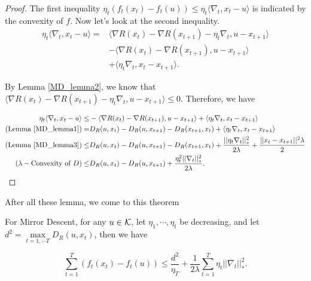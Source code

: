 \documentclass[../main.tex]{subfiles}
\begin{document}
\begin{proof}
	The first inequality $\eta_t (f_t(x_t) - f_t(u)) \leq \eta_t \langle \nabla_t, x_t -u \rangle $ is indicated by the convexity of $f$. Now let's look at the second inequality.
	\begin{equation*}
		\begin{aligned}
			\eta_t\langle \nabla_t, x_t -u \rangle =&  \langle \nabla R(x_t) - \nabla R(x_{t+1})-\eta_t \nabla_t , u -x_{t+1}\rangle  \\
													& -  \langle \nabla R(x_t) - \nabla R(x_{t+1})  , u -x_{t+1}\rangle  \\
													& +  \langle \eta_t \nabla_t  , x_t -x_{t+1}\rangle.
		\end{aligned}
	\end{equation*}


By Lemma \ref{MD_lemma2}, we know that $\langle \nabla R(x_t) - \nabla R(x_{t+1})-\eta_t \nabla_t , u -x_{t+1}\rangle \leq 0$. Therefore, we have

\begin{equation*}
	\begin{aligned}
	\eta_t\langle \nabla_t, x_t -u \rangle \leq  
	& -  \langle \nabla R(x_t) - \nabla R(x_{t+1})  , u -x_{t+1}\rangle  +  \langle \eta_t \nabla_t  , x_t -x_{t+1}\rangle \\
	\textmd{(Lemma \ref{MD_lemma1})} = & D_R(u,x_t)  - D_R(u,x_{t+1}) - D_R(x_{t+1},x_t)    +  \langle \eta_t \nabla_t  , x_t -x_{t+1}\rangle \\
	\textmd{(Lemma \ref{MD_lemma3})} \leq & D_R(u,x_t)  - D_R(u,x_{t+1}) - D_R(x_{t+1},x_t)    +   \frac{||\eta_t \nabla_t||_*^2}{2\lambda} + \frac{||x_t -x_{t+1}||^2\lambda}{2}\\
	(\lambda-\textmd{Convexity of } D) \leq & D_R(u,x_t)  - D_R(u,x_{t+1})   +   \frac{\eta_t^2|| \nabla_t||_*^2}{2\lambda}.
	\end{aligned}
\end{equation*}
\end{proof}
After all these lemma, we come to this theorem

\begin{theorem}
	For Mirror Descent, for any $u \in \mathcal{K}$, let $\eta_1 ,\cdots , \eta_t$ be decreasing, and let $d^2 = \max\limits_{t= 1,\cdots T} D_R(u,x_t)$, then we have
	 
	\begin{equation}
		\sum\limits_{t = 1}^T (f_t(x_t) - f_t(u)) \leq \frac{d^2}{\eta_T}+ \frac{1}{2\lambda} \sum\limits_{t=1}^T \eta_t ||\nabla_t||_*^2.
	\end{equation}
\end{theorem}
\end{document}

